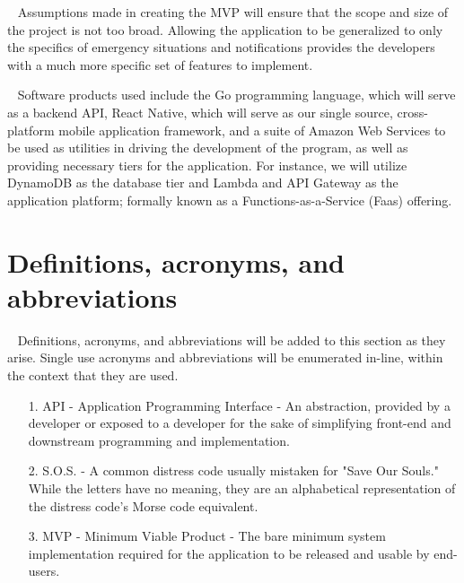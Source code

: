 \documentclass{scrreprt}
\begin{document}
\par ~ Assumptions made in creating the MVP will ensure that the scope and size of the project is not too broad. Allowing the application to be generalized to only the specifics of emergency situations and notifications provides the developers with a much more specific set of features to implement.

\par ~ Software products used include the Go programming language, which will serve as a backend API, React Native, which will serve as our single source, cross-platform mobile application framework, and a suite of Amazon Web Services to be used as utilities in driving the development of the program, as well as providing necessary tiers for the application. For instance, we will utilize DynamoDB as the database tier and Lambda and API Gateway as the application platform; formally known as a Functions-as-a-Service (Faas) offering.


\section{Definitions, acronyms, and abbreviations}
\par ~ Definitions, acronyms, and abbreviations will be added to this section as they arise. Single use acronyms and abbreviations will be enumerated in-line, within the context that they are used.
\begin{enumerate}
	\item[1.] API - Application Programming Interface - An abstraction, provided by a developer or exposed to a developer for the sake of simplifying front-end and downstream programming and implementation.
	\item[2.] S.O.S. - A common distress code usually mistaken for "Save Our Souls." While the letters have no meaning, they are an alphabetical representation of the distress code's Morse code equivalent.
	\item[3.] MVP - Minimum Viable Product - The bare minimum system implementation required for the application to be released and usable by end-users.
\end{enumerate}
 
\end{document}
